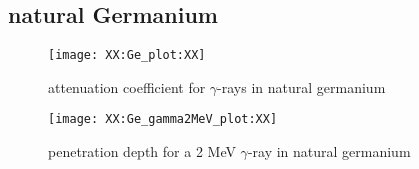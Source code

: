 \subsection{natural Germanium}

\begin{figure}[h]
\centering
	\texttt{[image: XX:Ge\_plot:XX]}
	\caption[Ge interaction]{attenuation coefficient for $\gamma$-rays in natural germanium}
	\label{fig:Gegammaplot}
\end{figure}

\begin{figure}[h]
\centering
	\texttt{[image: XX:Ge\_gamma2MeV\_plot:XX]}
	\caption[Ge interaction 2 MeV]{penetration depth for a 2 MeV $\gamma$-ray in natural germanium}
	\label{fig:Gegamma2MeVplot}
\end{figure}

